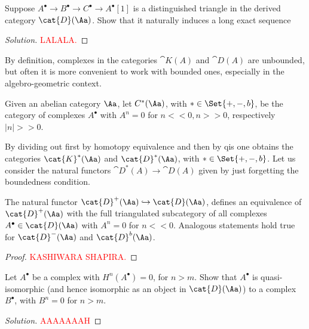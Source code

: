 \begin{exercise!}\label{derived-LECS}
    Suppose $A^{\bullet} \to B^{\bullet} \to C^{\bullet} \to A^{\bullet}[1]$
    is a distinguished triangle in the derived category $\cat{D}(\Aa)$.
    Show that it naturally induces a long exact sequence
    \begin{center}
    \end{center}
    \begin{proof}[Solution]
        \textcolor{red}{LALALA.}
    \end{proof}
\end{exercise!}


By definition, complexes in the categories 
$\cat{K}(A)$ and $\cat{D}(A)$ are unbounded, 
but often it is more convenient to work with bounded ones,
especially in the algebro-geometric context.

\begin{df}
    Given an abelian category $\Aa$,
    let $C^{*}(\Aa)$, with $* \in \Set{+,-,b}$, 
    be the category of complexes $A^{\bullet}$
    with $A^{n} = 0$ for $n << 0, n >> 0$,
    respectively $|n| >> 0$.
\end{df}

By dividing out first by homotopy equivalence 
and then by qis one obtains
the categories $\cat{K}^{*}(\Aa)$ and $\cat{D}^{*}(\Aa)$,
with $* \in \Set{+,-,b}$. 
Let us consider the natural functors 
$\cat{D}^{*}(A) \to \cat{D}(A)$ 
given by just forgetting the boundedness condition.

\begin{prop}
    The natural functor $\cat{D}^+(\Aa) \hookrightarrow \cat{D}(\Aa)$,
    defines an equivalence of $\cat{D}^{+}(\Aa)$ with
    the full triangulated subcategory of all 
    complexes $A^{\bullet} \in \cat{D}(\Aa)$ with
    $A^{n}=0$ for $n << 0$.
    Analogous statements hold true for $\cat{D}^{-}(\Aa)$
    and $\cat{D}^{b}(\Aa)$.
    \begin{proof}
        \textcolor{red}{KASHIWARA SHAPIRA.}
    \end{proof}
\end{prop}

\begin{exercise!}\label{null-terms}
    Let $A^{\bullet}$ be a complex with $H^{n}(A^{\bullet}) = 0$, for $n > m$.
    Show that $A^{\bullet}$ is quasi-isomorphic 
    (and hence isomorphic as an object in $\cat{D}(\Aa)$)
    to a complex $B^{\bullet}$, with $B^{n}=0$ for $n > m$.
    \begin{proof}[Solution]
        \textcolor{red}{AAAAAAAH}
    \end{proof}
\end{exercise!}

